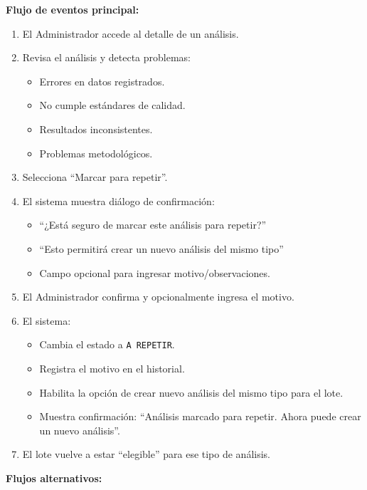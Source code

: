 \vspace{0.5em}
\noindent\textbf{Flujo de eventos principal:}
\begin{enumerate}[nosep]
    \item El Administrador accede al detalle de un análisis.
    \item Revisa el análisis y detecta problemas:
    \begin{itemize}[nosep]
        \item Errores en datos registrados.
        \item No cumple estándares de calidad.
        \item Resultados inconsistentes.
        \item Problemas metodológicos.
    \end{itemize}
    \item Selecciona ``Marcar para repetir''.
    \item El sistema muestra diálogo de confirmación:
    \begin{itemize}[nosep]
        \item ``¿Está seguro de marcar este análisis para repetir?''
        \item ``Esto permitirá crear un nuevo análisis del mismo tipo''
        \item Campo opcional para ingresar motivo/observaciones.
    \end{itemize}
    \item El Administrador confirma y opcionalmente ingresa el motivo.
    \item El sistema:
    \begin{itemize}[nosep]
        \item Cambia el estado a \texttt{A REPETIR}.
        \item Registra el motivo en el historial.
        \item Habilita la opción de crear nuevo análisis del mismo tipo para el lote.
        \item Muestra confirmación: ``Análisis marcado para repetir. Ahora puede crear un nuevo análisis''.
    \end{itemize}
    \item El lote vuelve a estar ``elegible'' para ese tipo de análisis.
\end{enumerate}

\vspace{0.5em}
\noindent\textbf{Flujos alternativos:}

